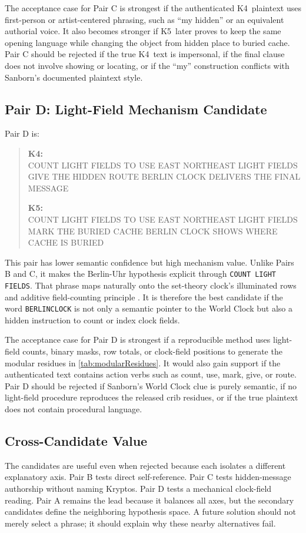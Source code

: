 \documentclass[12pt]{paperFormatting}
\newcommand{\Kfour}{K4}
\newcommand{\Kfive}{K5}
\begin{document}
\begin{thesisbody}
The acceptance case for Pair C is strongest if the authenticated \Kfour\ plaintext uses first-person or artist-centered phrasing, such as ``my hidden'' or an equivalent authorial voice. It also becomes stronger if \Kfive\ later proves to keep the same opening language while changing the object from hidden place to buried cache. Pair C should be rejected if the true \Kfour\ text is impersonal, if the final clause does not involve showing or locating, or if the ``my'' construction conflicts with Sanborn's documented plaintext style.

\subsection{Pair D: Light-Field Mechanism Candidate}
Pair D is:
\begin{quote}
\footnotesize\raggedright
\textbf{\Kfour:}\\
COUNT LIGHT FIELDS TO USE EAST NORTHEAST LIGHT FIELDS GIVE THE HIDDEN ROUTE BERLIN CLOCK DELIVERS THE FINAL MESSAGE

\textbf{\Kfive:}\\
COUNT LIGHT FIELDS TO USE EAST NORTHEAST LIGHT FIELDS MARK THE BURIED CACHE BERLIN CLOCK SHOWS WHERE CACHE IS BURIED
\end{quote}
This pair has lower semantic confidence but high mechanism value. Unlike Pairs B and C, it makes the Berlin-Uhr hypothesis explicit through \texttt{COUNT LIGHT FIELDS}. That phrase maps naturally onto the set-theory clock's illuminated rows and additive field-counting principle \cite{berlinUhrOfficial}. It is therefore the best candidate if the word \texttt{BERLINCLOCK} is not only a semantic pointer to the World Clock but also a hidden instruction to count or index clock fields.

The acceptance case for Pair D is strongest if a reproducible method uses light-field counts, binary masks, row totals, or clock-field positions to generate the modular residues in \autoref{tab:modularResidues}. It would also gain support if the authenticated text contains action verbs such as count, use, mark, give, or route. Pair D should be rejected if Sanborn's World Clock clue is purely semantic, if no light-field procedure reproduces the released crib residues, or if the true plaintext does not contain procedural language.

\subsection{Cross-Candidate Value}
The candidates are useful even when rejected because each isolates a different explanatory axis. Pair B tests direct self-reference. Pair C tests hidden-message authorship without naming Kryptos. Pair D tests a mechanical clock-field reading. Pair A remains the lead because it balances all axes, but the secondary candidates define the neighboring hypothesis space. A future solution should not merely select a phrase; it should explain why these nearby alternatives fail.


\end{thesisbody}
\end{document}
